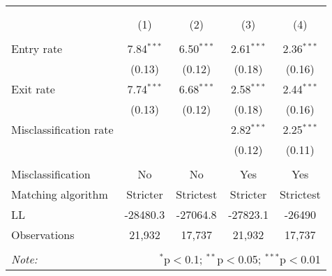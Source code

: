 
\begin{table}[!htbp] \centering 
  \caption{} 
  \label{table_matching_implied} 
\begin{tabular}{@{\extracolsep{5pt}}lcccc} 
\\[-1.8ex]\hline 
\hline \\[-1.8ex] 
\\[-1.8ex] & (1) & (2) & (3) & (4)\\ 
\hline \\[-1.8ex] 
 Entry rate & 7.84$^{***}$ & 6.50$^{***}$ & 2.61$^{***}$ & 2.36$^{***}$ \\ 
  & (0.13) & (0.12) & (0.18) & (0.16) \\ 
  Exit rate & 7.74$^{***}$ & 6.68$^{***}$ & 2.58$^{***}$ & 2.44$^{***}$ \\ 
  & (0.13) & (0.12) & (0.18) & (0.16) \\ 
  Misclassification rate &  &  & 2.82$^{***}$ & 2.25$^{***}$ \\ 
  &  &  & (0.12) & (0.11) \\ 
 \hline \\[-1.8ex] 
Misclassification & No & No & Yes & Yes \\ 
Matching algorithm & Stricter & Strictest & Stricter & Strictest \\ 
LL & -28480.3 & -27064.8 & -27823.1 & -26490 \\ 
Observations & 21,932 & 17,737 & 21,932 & 17,737 \\ 
\hline 
\hline \\[-1.8ex] 
\textit{Note:}  & \multicolumn{4}{r}{$^{*}$p$<$0.1; $^{**}$p$<$0.05; $^{***}$p$<$0.01} \\ 
\end{tabular} 
\end{table} 
